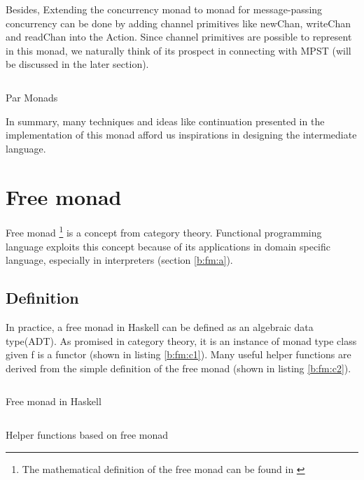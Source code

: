 Besides, Extending the concurrency monad to monad for message-passing concurrency can be done by adding channel primitives like newChan, writeChan and readChan into the Action. Since channel primitives are possible to represent in this monad, we naturally think of its prospect in connecting with MPST (will be discussed in the later section).
\begin{listing}[ht]
  \inputminted{haskell}{background/mo-par.hs}
  \caption{Par Monads}
  \label{b:mo:c3}
\end{listing}

In summary, many techniques and ideas like continuation presented in the implementation of this monad afford us inspirations in designing the intermediate language.
\section{Free monad} \label{b:fm}
Free monad \footnote{The mathematical definition of the free monad can be found in \cite{contributorsCatsFreeMonads}} is a concept from category theory.
Functional programming language exploits this concept because of its applications in domain specific language, especially in interpreters (section \ref{b:fm:a}).
\subsection{Definition}
In practice, a free monad in Haskell can be defined as an algebraic data type(ADT). As promised in category theory, it is an instance of monad type class given f is a functor (shown in listing \ref{b:fm:c1}). Many useful helper functions are derived from the simple definition of the free monad (shown in listing \ref{b:fm:c2}).
\begin{listing}[ht]
  \inputminted{haskell}{background/fm-construction.hs}
  \caption{Free monad in Haskell}
  \label{b:fm:c1}
\end{listing}
\begin{listing}[ht]
  \inputminted{haskell}{background/fm-helper.hs}
  \caption{Helper functions based on free monad}
  \label{b:fm:c2}
\end{listing}
